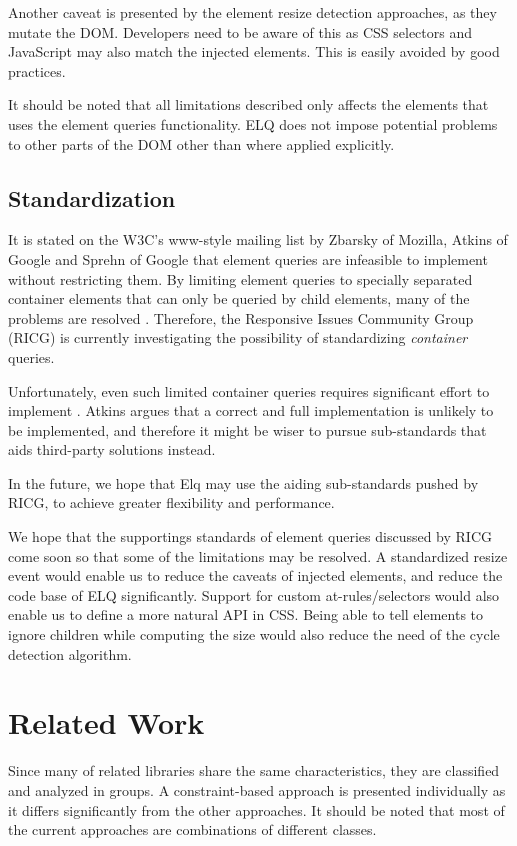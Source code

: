 \documentclass{acm_proc_article-sp}
\newcommand{\elq}{ELQ}
\begin{document}
    Another caveat is presented by the element resize detection approaches, as they mutate the DOM.
    Developers need to be aware of this as CSS selectors and JavaScript may also match the injected elements.
    This is easily avoided by good practices.

    It should be noted that all limitations described only affects the elements that uses the element queries functionality.
    \elq{} does not impose potential problems to other parts of the DOM other than where applied explicitly.

  \subsection{Standardization}
    It is stated on the W3C's www-style mailing list \cite{w3c_eq_mail} by Zbarsky of Mozilla, Atkins of Google and Sprehn of Google that element queries are infeasible to implement without restricting them.
    By limiting element queries to specially separated container elements that can only be queried by child elements, many of the problems are resolved \cite{ricg_irc_log,ricg_issue_viewport}.
    Therefore, the Responsive Issues Community Group (RICG) is currently investigating the possibility of standardizing \emph{container} queries.

    Unfortunately, even such limited container queries requires significant effort to implement \cite{ricg_issue_viewport}.
    Atkins argues that a correct and full implementation is unlikely to be implemented, and therefore it might be wiser to pursue sub-standards that aids third-party solutions instead.
   
    In the future, we hope that Elq may use the aiding sub-standards pushed by RICG, to achieve greater flexibility and performance.

    We hope that the supportings standards of element queries discussed by RICG come soon so that some of the limitations may be resolved.
    A standardized resize event would enable us to reduce the caveats of injected elements, and reduce the code base of \elq{} significantly.
    Support for custom at-rules/selectors would also enable us to define a more natural API in CSS.
    Being able to tell elements to ignore children while computing the size would also reduce the need of the cycle detection algorithm.

\section{Related Work}
  Since many of related libraries share the same characteristics, they are classified and analyzed in groups.
  A constraint-based approach is presented individually as it differs significantly from the other approaches.
  It should be noted that most of the current approaches are combinations of different classes.
\end{document}

